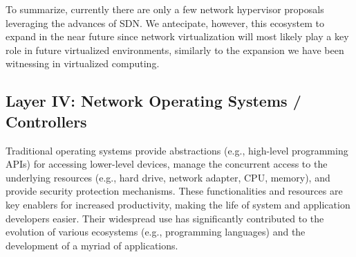 To summarize, currently there are only a few network hypervisor proposals leveraging the advances of SDN.
We antecipate, however, this ecosystem to expand in the near future since network virtualization will most likely play a key role in future virtualized environments, similarly to the expansion we have been witnessing in virtualized computing.




\subsection{Layer IV: Network Operating Systems / Controllers}
\label{sec:controllers}

Traditional operating systems provide abstractions (e.g., high-level programming APIs) for accessing 
lower-level devices, manage the concurrent access to the underlying resources (e.g., hard drive, network 
adapter, CPU, memory), and provide security protection mechanisms. These functionalities and resources 
are key enablers for increased productivity, making the life of system and application developers easier. Their 
widespread use has significantly contributed to the evolution of various ecosystems (e.g., programming 
languages) and the development of a myriad of applications.

